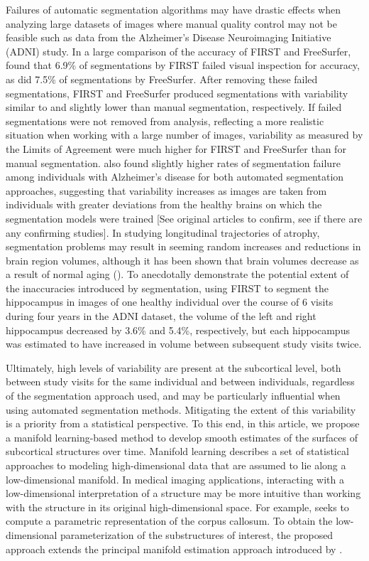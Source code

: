 \documentclass[11pt,reqno]{article}
\theoremstyle{definition}
\begin{document}
Failures of automatic segmentation algorithms may have drastic effects when analyzing large datasets of images where manual quality control may not be feasible such as data from the Alzheimer's Disease Neuroimaging Initiative (ADNI) study. In a large comparison of the accuracy of FIRST and FreeSurfer, \cite{mulderHippocampalVolumeChange2014} found that 6.9\% of segmentations by FIRST failed visual inspection for accuracy, as did 7.5\% of segmentations by FreeSurfer. After removing these failed segmentations, FIRST and FreeSurfer produced segmentations with variability similar to and slightly lower than manual segmentation, respectively. If failed segmentations were not removed from analysis, reflecting a more realistic situation when working with a large number of images, variability as measured by the Limits of Agreement were much higher for FIRST and FreeSurfer than for manual segmentation. \cite{mulderHippocampalVolumeChange2014} also found slightly higher rates of segmentation failure among individuals with Alzheimer's disease for both automated segmentation approaches, suggesting that variability increases as images are taken from individuals with greater deviations from the healthy brains on which the segmentation models were trained [See original articles to confirm, see if there are any confirming studies]. In studying longitudinal trajectories of atrophy, segmentation problems may result in seeming random increases and reductions in brain region volumes, although it has been shown that brain volumes decrease as a result of normal aging (\cite{scahill2003longitudinal}). To anecdotally demonstrate the potential extent of the inaccuracies introduced by segmentation, using FIRST to segment the hippocampus in images of one healthy individual over the course of 6 visits during four years in the ADNI dataset, the volume of the left and right hippocampus decreased by 3.6\% and 5.4\%, respectively, but each hippocampus was estimated to have increased in volume between subsequent study visits twice. 

Ultimately, high levels of variability are present at the subcortical level, both between study visits for the same individual and between individuals, regardless of the segmentation approach used, and may be particularly influential when using automated segmentation methods. Mitigating the extent of this variability is a priority from a statistical perspective. To this end, in this article, we propose a manifold learning-based method to develop smooth estimates of the surfaces of subcortical structures over time. Manifold learning describes a set of statistical approaches to modeling high-dimensional data that are assumed to lie along a low-dimensional manifold. In medical imaging applications, interacting with a low-dimensional interpretation of a structure may be more intuitive than working with the structure in its original high-dimensional space. For example, \cite{yueParameterizationWhiteMatter2016} seeks to compute a parametric representation of the corpus callosum. To obtain the low-dimensional parameterization of the substructures of interest, the proposed approach extends the principal manifold estimation approach introduced by \cite{mengPrincipalManifoldEstimation2021}.
\end{document}
